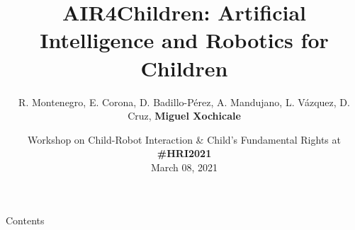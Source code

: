 \documentclass[xcolor={dvipsnames},aspectratio=169,10pt]{beamer}
\title{AIR4Children: Artificial Intelligence and Robotics for Children}
\author{
R. Montenegro,
E. Corona,
D. Badillo-P\'erez,
A. Mandujano,
L. V\'azquez,
D. Cruz,
{\bf Miguel Xochicale}
}
\date{
Workshop on Child-Robot Interaction \& Child's Fundamental Rights at {\bf \#HRI2021} \\
March 08, 2021
}
\institute{
	\faEnvelope   air4children@gmail.com \\
	\faGithubAlt @air4children \faTwitter @air4children  
		}
\begin{document}
\maketitle

\begin{frame}{Contents}
    \tableofcontents
\end{frame}







\maketitle
\end{document}
